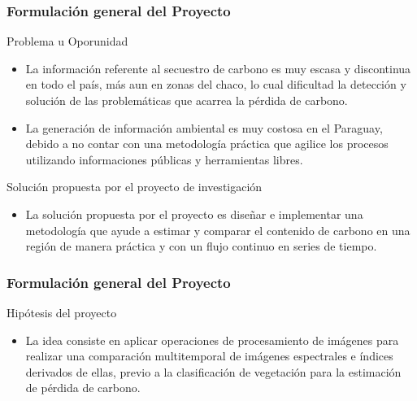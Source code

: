 \documentclass[xcolor=table]{beamer}
\begin{document}
\begin{frame}
	\frametitle{Formulaci\'on general del Proyecto}
	\begin{block}{Problema u Oporunidad}
		\begin{itemize}
			\item La informaci\'on referente al secuestro de carbono es muy escasa y discontinua en todo el pa\'is, m\'as aun en zonas del chaco, lo cual dificultad la detecci\'on y soluci\'on de las problem\'aticas que acarrea la p\'erdida de carbono.
			\item La generaci\'on de informaci\'on ambiental es muy costosa en el Paraguay, debido a no contar con una metodología pr\'actica  que agilice los procesos utilizando informaciones p\'ublicas y herramientas libres.
		\end{itemize}
	\end{block}
		\begin{block}{Soluci\'on propuesta por el proyecto de investigaci\'on}
			\begin{itemize}
				\item La soluci\'on propuesta por el proyecto es dise\~{n}ar e implementar una metodolog\'ia que ayude a estimar y comparar  el contenido de carbono en una regi\'on de manera pr\'actica y con un flujo continuo en series de tiempo.
			\end{itemize}
		\end{block}
	
\end{frame}


\begin{frame}
	\frametitle{Formulaci\'on general del Proyecto}
	\begin{block}{Hip\'otesis del proyecto}
		\begin{itemize}
			\item La idea consiste en aplicar operaciones de procesamiento de im\'agenes para realizar una comparaci\'on multitemporal de im\'agenes espectrales e \'indices derivados de ellas, previo a la clasificaci\'on de vegetaci\'on para la estimaci\'on de p\'erdida de carbono.
		\end{itemize}
	\end{block}
	
\end{frame}
\end{document}
